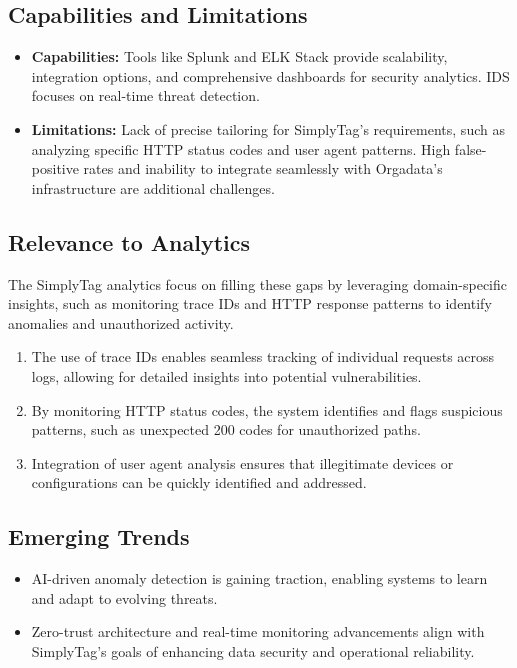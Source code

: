 \subsection{Capabilities and Limitations}
\begin{itemize}
	\item \textbf{Capabilities:} Tools like Splunk and ELK Stack provide scalability, integration options, and comprehensive dashboards for security analytics. IDS focuses on real-time threat detection.
	\item \textbf{Limitations:}  Lack of precise tailoring for SimplyTag’s requirements, such as analyzing specific HTTP status codes and user agent patterns. High false-positive rates and inability to integrate seamlessly with Orgadata’s infrastructure are additional challenges.
\end{itemize}

\subsection{Relevance to Analytics}

The SimplyTag analytics focus on filling these gaps by leveraging domain-specific insights, such as monitoring trace IDs and HTTP response patterns to identify anomalies and unauthorized activity.

\begin{enumerate}
	\item The use of trace IDs enables seamless tracking of individual requests across logs, allowing for detailed insights into potential vulnerabilities.
	\item By monitoring HTTP status codes, the system identifies and flags suspicious patterns, such as unexpected 200 codes for unauthorized paths.
	\item Integration of user agent analysis ensures that illegitimate devices or configurations can be quickly identified and addressed.
\end{enumerate}

\subsection{Emerging Trends}
\begin{itemize}
	\item AI-driven anomaly detection is gaining traction, enabling systems to learn and adapt to evolving threats.
	\item Zero-trust architecture and real-time monitoring advancements align with SimplyTag’s goals of enhancing data security and operational reliability.
\end{itemize}

